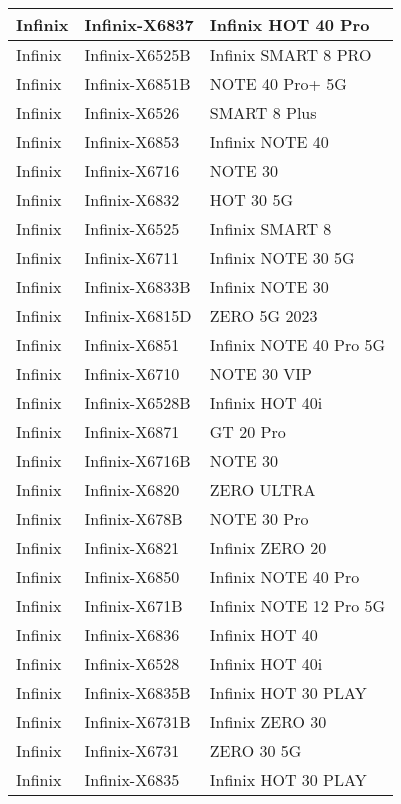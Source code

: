 \begin{tabularx}{\linewidth}{|l|X|X|}
        Infinix & Infinix-X6837 & Infinix HOT 40 Pro \\ \hline
        Infinix & Infinix-X6525B & Infinix SMART 8 PRO \\ \hline
        Infinix & Infinix-X6851B & NOTE 40 Pro+ 5G \\ \hline
        Infinix & Infinix-X6526 & SMART 8 Plus \\ \hline
        Infinix & Infinix-X6853 & Infinix NOTE 40 \\ \hline
        Infinix & Infinix-X6716 & NOTE 30 \\ \hline
        Infinix & Infinix-X6832 & HOT 30 5G \\ \hline
        Infinix & Infinix-X6525 & Infinix SMART 8 \\ \hline
        Infinix & Infinix-X6711 & Infinix NOTE 30 5G \\ \hline
        Infinix & Infinix-X6833B & Infinix NOTE 30 \\ \hline
        Infinix & Infinix-X6815D & ZERO 5G 2023 \\ \hline
        Infinix & Infinix-X6851 & Infinix NOTE 40 Pro 5G \\ \hline
        Infinix & Infinix-X6710 & NOTE 30 VIP \\ \hline
        Infinix & Infinix-X6528B & Infinix HOT 40i \\ \hline
        Infinix & Infinix-X6871 & GT 20 Pro \\ \hline
        Infinix & Infinix-X6716B & NOTE 30 \\ \hline
        Infinix & Infinix-X6820 & ZERO ULTRA \\ \hline
        Infinix & Infinix-X678B & NOTE 30 Pro \\ \hline
        Infinix & Infinix-X6821 & Infinix ZERO 20 \\ \hline
        Infinix & Infinix-X6850 & Infinix NOTE 40 Pro \\ \hline
        Infinix & Infinix-X671B & Infinix NOTE 12 Pro 5G \\ \hline
        Infinix & Infinix-X6836 & Infinix HOT 40 \\ \hline
        Infinix & Infinix-X6528 & Infinix HOT 40i \\ \hline
        Infinix & Infinix-X6835B & Infinix HOT 30 PLAY \\ \hline
        Infinix & Infinix-X6731B & Infinix ZERO 30 \\ \hline
        Infinix & Infinix-X6731 & ZERO 30 5G \\ \hline
        Infinix & Infinix-X6835 & Infinix HOT 30 PLAY \\ \hline

\end{tabularx}
